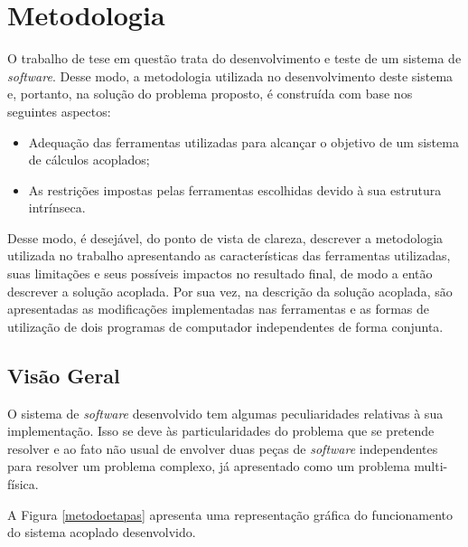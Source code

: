 \chapter{Metodologia}
\label{chap:metodologia}

O trabalho de tese em questão trata do desenvolvimento e teste
de um sistema de \textit{software}. Desse modo, a metodologia utilizada no desenvolvimento
deste sistema e, portanto, na solução do problema proposto,
é construída com base nos seguintes aspectos:

\begin{itemize}
\item Adequação das ferramentas utilizadas para alcançar o objetivo de um sistema de cálculos acoplados;
\item As restrições impostas pelas ferramentas escolhidas devido à sua estrutura intrínseca.
\end{itemize}

Desse modo, é desejável, do ponto de vista de clareza, descrever a metodologia utilizada no trabalho
apresentando as características das ferramentas utilizadas, suas limitações e seus possíveis impactos
no resultado final, de modo a então descrever a solução acoplada. Por sua vez, na descrição da solução
acoplada, são apresentadas as modificações implementadas nas ferramentas e as formas de utilização
de dois programas de computador independentes de forma conjunta.


\section{Visão Geral}

O sistema de \textit{software} desenvolvido tem algumas peculiaridades relativas à sua
implementação. Isso se deve às particularidades do problema que se pretende resolver e ao
fato não usual de envolver duas peças de \textit{software} independentes para resolver
um problema complexo, já apresentado como um problema multi-física.

A Figura \ref{metodoetapas} apresenta uma representação gráfica do funcionamento do sistema
acoplado desenvolvido.

